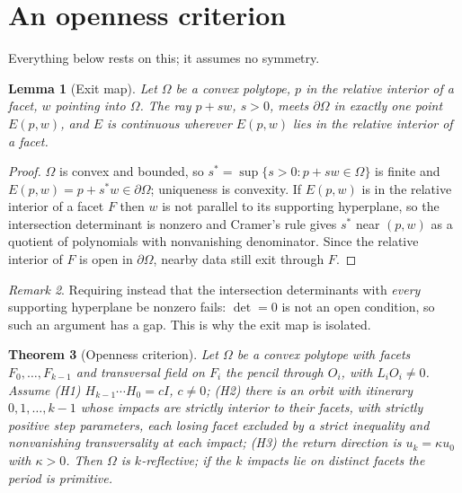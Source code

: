 \documentclass[11pt,a4paper]{article}
\theoremstyle{plain}
\newtheorem{theorem}{Theorem}[section]
\newtheorem{lemma}[theorem]{Lemma}
\theoremstyle{definition}
\theoremstyle{remark}
\newtheorem{remark}[theorem]{Remark}
\begin{document}
\section{An openness criterion}

Everything below rests on this; it assumes no symmetry.

\begin{lemma}[Exit map]\label{lem:exit}
Let $\Omega$ be a convex polytope, $p$ in the relative interior of a facet, $w$ pointing into
$\Omega$. The ray $p+sw$, $s>0$, meets $\partial\Omega$ in exactly one point $E(p,w)$, and
$E$ is continuous wherever $E(p,w)$ lies in the relative interior of a facet.
\end{lemma}

\begin{proof}
$\Omega$ is convex and bounded, so $s^\ast=\sup\{s>0:p+sw\in\Omega\}$ is finite and
$E(p,w)=p+s^\ast w\in\partial\Omega$; uniqueness is convexity. If $E(p,w)$ is
in the relative interior of a facet $F$ then $w$ is not parallel to its
supporting hyperplane, so the intersection determinant is nonzero and Cramer's
rule gives $s^\ast$ near $(p,w)$ as a quotient of polynomials with nonvanishing
denominator. Since the relative interior of $F$ is open in $\partial\Omega$,
nearby data still exit through $F$.
\end{proof}

\begin{remark}
Requiring instead that the intersection determinants with \emph{every} supporting
hyperplane be nonzero fails: $\det=0$ is not an open condition, so such an argument has
a gap. This is why the exit map is isolated.
\end{remark}

\begin{theorem}[Openness criterion]\label{thm:open}
Let $\Omega$ be a convex polytope with facets $F_0,\dots,F_{k-1}$ and transversal
field on $F_i$ the pencil through $O_i$, with $L_iO_i\neq0$. Assume
\textup{(H1)} $H_{k-1}\cdots H_0=cI$, $c\neq0$; \textup{(H2)} there is an orbit
with itinerary $0,1,\dots,k-1$ whose impacts are strictly interior to their facets,
with strictly positive step parameters, each losing facet excluded by a strict
inequality and nonvanishing transversality at each impact; \textup{(H3)} the return
direction is $u_k=\kappa u_0$ with $\kappa>0$. Then $\Omega$ is $k$-reflective; if
the $k$ impacts lie on distinct facets the period is primitive.
\end{theorem}
\end{document}
